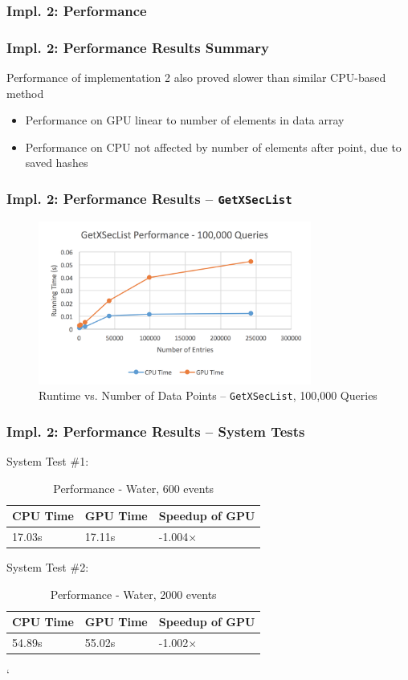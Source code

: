 \documentclass{beamer}
\begin{document}
\subsubsection{Impl. 2: Performance}
\begin{frame}
\frametitle{Impl. 2: Performance Results Summary}
Performance of implementation 2 also proved slower than 
similar CPU-based method
\begin{itemize}
\item Performance on GPU linear to number of elements in data array
\item Performance on CPU not affected by number of elements after point, due to saved hashes
\end{itemize}
\end{frame}

\begin{frame}
\frametitle{Impl. 2: Performance Results -- \texttt{GetXSecList}}
\begin{figure}
\centering
\includegraphics[width=0.8\textwidth]{images/getxseclist_100000.png}
\caption{Runtime vs. Number of Data Points -- \texttt{GetXSecList}, 100,000 Queries}
\end{figure}
\end{frame}

\begin{frame}
\frametitle{Impl. 2: Performance Results -- System Tests}
System Test \#1:
\begin{table}
	\begin{tabular}{lll}
	\toprule
	\bf CPU Time&\bf  GPU Time&\bf Speedup of GPU\\\midrule
	17.03s&17.11s&-1.004$\times$\\\bottomrule
	\end{tabular}
	\caption{Performance - Water, 600 events}
\end{table}
System Test \#2:
\begin{table}
	\begin{tabular}{lll}
	\toprule
	\bf CPU Time&\bf  GPU Time&\bf Speedup of GPU\\\midrule
	54.89s&55.02s&-1.002$\times$\\\bottomrule
	\end{tabular}
	\caption{Performance - Water, 2000 events}
\end{table}
\end{frame}`
\end{document}
